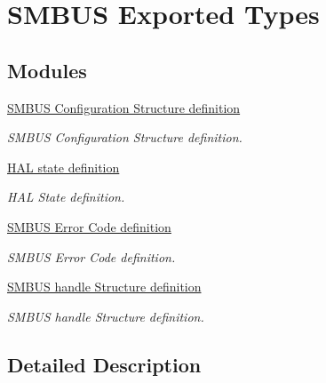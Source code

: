 \hypertarget{group___s_m_b_u_s___exported___types}{}\section{S\+M\+B\+US Exported Types}
\label{group___s_m_b_u_s___exported___types}
\subsection*{Modules}
\begin{DoxyCompactItemize}
\item 
\hyperlink{group___s_m_b_u_s___configuration___structure__definition}{S\+M\+B\+U\+S Configuration Structure definition}
\begin{DoxyCompactList}\small\item\em S\+M\+B\+US Configuration Structure definition. \end{DoxyCompactList}\item 
\hyperlink{group___h_a_l__state__definition}{H\+A\+L state definition}
\begin{DoxyCompactList}\small\item\em H\+AL State definition. \end{DoxyCompactList}\item 
\hyperlink{group___s_m_b_u_s___error___code__definition}{S\+M\+B\+U\+S Error Code definition}
\begin{DoxyCompactList}\small\item\em S\+M\+B\+US Error Code definition. \end{DoxyCompactList}\item 
\hyperlink{group___s_m_b_u_s__handle___structure__definition}{S\+M\+B\+U\+S handle Structure definition}
\begin{DoxyCompactList}\small\item\em S\+M\+B\+US handle Structure definition. \end{DoxyCompactList}\end{DoxyCompactItemize}


\subsection{Detailed Description}
